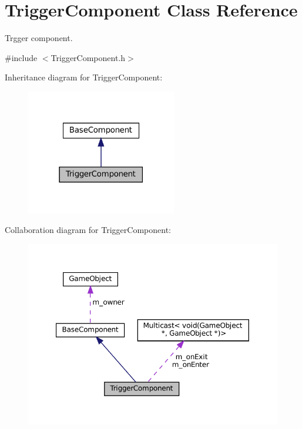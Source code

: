 \hypertarget{classTriggerComponent}{}\section{Trigger\+Component Class Reference}
\label{classTriggerComponent}


Trgger component.  




{\ttfamily \#include $<$Trigger\+Component.\+h$>$}



Inheritance diagram for Trigger\+Component\+:
\nopagebreak
\begin{figure}[H]
\begin{center}
\leavevmode
\includegraphics[width=186pt]{classTriggerComponent__inherit__graph}
\end{center}
\end{figure}


Collaboration diagram for Trigger\+Component\+:
\nopagebreak
\begin{figure}[H]
\begin{center}
\leavevmode
\includegraphics[width=350pt]{classTriggerComponent__coll__graph}
\end{center}
\end{figure}
